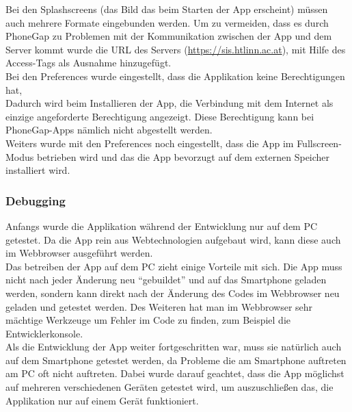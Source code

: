 Bei den Splashscreens (das Bild das beim Starten der App erscheint) müssen auch mehrere Formate eingebunden werden.
Um zu vermeiden, dass es durch PhoneGap zu Problemen mit der Kommunikation zwischen der App und dem Server kommt wurde die URL des Servers (\href{https://sis.htlinn.ac.at}{https://sis.htlinn.ac.at}), mit Hilfe des Access-Tags als Ausnahme hinzugefügt.\\

Bei den Preferences wurde eingestellt, dass die Applikation keine Berechtigungen hat,\\



Dadurch wird beim Installieren der App, die Verbindung mit dem Internet als einzige angeforderte Berechtigung angezeigt. Diese Berechtigung kann bei PhoneGap-Apps nämlich nicht abgestellt werden.\\

Weiters wurde mit den Preferences noch eingestellt, dass die App im Fullscreen-Modus betrieben wird und das die App bevorzugt auf dem externen Speicher installiert wird.\\

\subsubsection{Debugging}
Anfangs wurde die Applikation während der Entwicklung nur auf dem PC getestet. Da die App rein aus Webtechnologien aufgebaut wird, kann diese auch im Webbrowser ausgeführt werden.\\
Das betreiben der App auf dem PC zieht einige Vorteile mit sich. Die App muss nicht nach jeder Änderung neu \enquote{gebuildet} und auf das Smartphone geladen werden, sondern kann direkt nach der Änderung des Codes im Webbrowser neu geladen und getestet werden. Des Weiteren hat man im Webbrowser sehr mächtige Werkzeuge um Fehler im Code zu finden, zum Beispiel die Entwicklerkonsole.\\
Als die Entwicklung der App weiter fortgeschritten war, muss sie natürlich auch auf dem Smartphone getestet werden, da Probleme die am Smartphone auftreten am PC oft nicht auftreten. Dabei wurde darauf geachtet, dass die App möglichst auf mehreren verschiedenen Geräten getestet wird, um auszuschließen das, die Applikation nur auf einem Gerät funktioniert.\\

